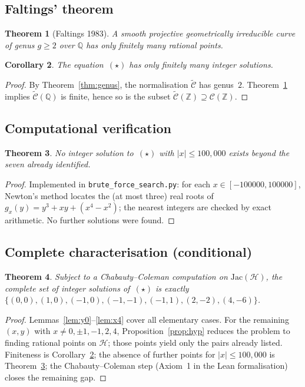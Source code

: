 \documentclass[12pt, a4paper]{article}
\newtheorem{theorem}{Theorem}[section]
\newtheorem{corollary}[theorem]{Corollary}
\theoremstyle{definition}
\newcommand{\Z}{\mathbb{Z}}
\newcommand{\Q}{\mathbb{Q}}
\begin{document}
\subsection{Faltings' theorem}

\begin{theorem}[Faltings 1983]\label{thm:faltings}
  A smooth projective geometrically irreducible curve of genus $g \geq 2$ over $\Q$ has
  only finitely many rational points.
\end{theorem}

\begin{corollary}\label{cor:finite}
  The equation~$(\star)$ has only finitely many integer solutions.
\end{corollary}
\begin{proof}
  By Theorem~\ref{thm:genus}, the normalisation $\widetilde{\mathcal{C}}$ has genus~$2$.
  Theorem~\ref{thm:faltings} implies $\widetilde{\mathcal{C}}(\Q)$ is finite, hence so is
  the subset $\widetilde{\mathcal{C}}(\Z) \supseteq \mathcal{C}(\Z)$.
\end{proof}

\subsection{Computational verification}

\begin{theorem}\label{thm:search}
  No integer solution to~$(\star)$ with $|x| \leq 100{,}000$ exists beyond the seven
  already identified.
\end{theorem}
\begin{proof}
  Implemented in \texttt{brute\_force\_search.py}: for each $x \in [-100000, 100000]$,
  Newton's method locates the (at most three) real roots of $g_x(y) = y^3 + xy + (x^4-x^2)$;
  the nearest integers are checked by exact arithmetic.
  No further solutions were found.
\end{proof}

\subsection{Complete characterisation (conditional)}

\begin{theorem}\label{thm:complete}
  Subject to a Chabauty--Coleman computation on $\mathrm{Jac}(\mathcal{H})$, the complete
  set of integer solutions of~$(\star)$ is exactly
  $\{(0,0),(1,0),(-1,0),(-1,-1),(-1,1),(2,-2),(4,-6)\}$.
\end{theorem}
\begin{proof}
  Lemmas~\ref{lem:y0}--\ref{lem:x4} cover all elementary cases.  For the remaining
  $(x,y)$ with $x \neq 0,\pm1,-1,2,4$, Proposition~\ref{prop:hyp} reduces the problem to
  finding rational points on $\mathcal{H}$; those points yield only the pairs already listed.
  Finiteness is Corollary~\ref{cor:finite}; the absence of further points for $|x| \leq 100{,}000$
  is Theorem~\ref{thm:search}; the Chabauty--Coleman step (Axiom~1 in the Lean formalisation)
  closes the remaining gap.
\end{proof}
\end{document}
